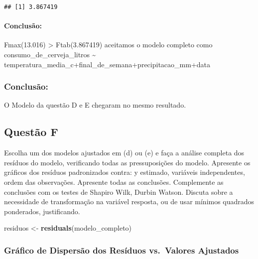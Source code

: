 \documentclass[
]{article}
\newenvironment{Shaded}{\begin{snugshade}}{\end{snugshade}}
\newcommand{\FunctionTok}[1]{\textcolor[rgb]{0.13,0.29,0.53}{\textbf{#1}}}
\newcommand{\NormalTok}[1]{#1}
\newcommand{\OtherTok}[1]{\textcolor[rgb]{0.56,0.35,0.01}{#1}}
\begin{document}
\begin{verbatim}
## [1] 3.867419
\end{verbatim}

\hypertarget{conclusuxe3o-8}{%
\paragraph{Conclusão:}\label{conclusuxe3o-8}}

Fmax(13.016) \textgreater{} Ftab(3.867419) aceitamos o modelo completo
como consumo\_de\_cerveja\_litros \textasciitilde{}
temperatura\_media\_c+final\_de\_semana+precipitacao\_mm+data

\hypertarget{conclusuxe3o-9}{%
\subsubsection{Conclusão:}\label{conclusuxe3o-9}}

O Modelo da questão D e E chegaram no mesmo resultado.

\hypertarget{questuxe3o-f}{%
\subsection{Questão F}\label{questuxe3o-f}}

Escolha um dos modelos ajustados em (d) ou (e) e faça a análise completa
dos resíduos do modelo, verificando todas as pressuposições do modelo.
Apresente os gráficos dos resíduos padronizados contra: y estimado,
variáveis independentes, ordem das observações. Apresente todas as
conclusões. Complemente as conclusões com os testes de Shapiro Wilk,
Durbin Watson. Discuta sobre a necessidade de transformação na variável
resposta, ou de usar mínimos quadrados ponderados, justificando.

\begin{Shaded}
\begin{Highlighting}[]
\NormalTok{residuos }\OtherTok{\textless{}{-}} \FunctionTok{residuals}\NormalTok{(modelo\_completo)}
\end{Highlighting}
\end{Shaded}

\hypertarget{gruxe1fico-de-dispersuxe3o-dos-resuxedduos-vs.-valores-ajustados}{%
\subsubsection{Gráfico de Dispersão dos Resíduos vs.~Valores
Ajustados}\label{gruxe1fico-de-dispersuxe3o-dos-resuxedduos-vs.-valores-ajustados}}
\end{document}
